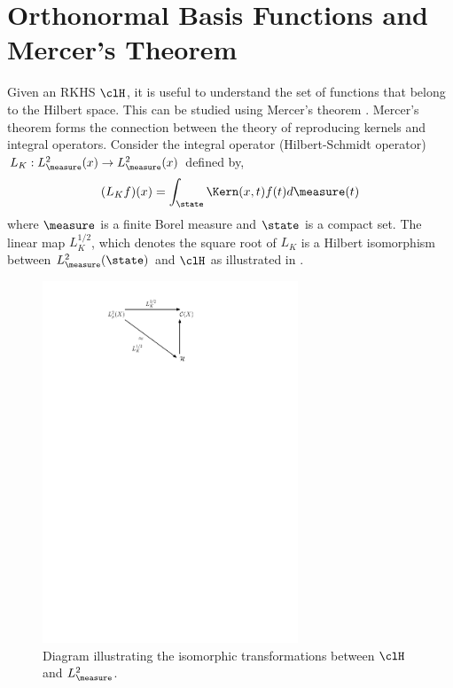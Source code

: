
\chapter{Orthonormal Basis Functions and Mercer's Theorem}
\label{a:mercers_theorem}

Given an RKHS $\clH$, it is useful to understand the set of functions that belong to the Hilbert space. This can be studied using Mercer's theorem \cite{merrus09}. Mercer's theorem forms the connection between the theory of reproducing kernels and integral operators. 
Consider the integral operator (Hilbert-Schmidt operator) $L_K:L^2_\measure(x) \to L^2_\measure(x)$ defined by,
\begin{equation}
(L_K f)(x) = \int_\state \Kern(x,t) f(t) d\measure(t)
\end{equation}
where $\measure$ is a finite Borel measure and $\state$ is a compact set.
The linear map $L_K^{1/2}$, which denotes the square root of $L_K$ is a Hilbert isomorphism between $L^2_{\measure}(\state)$ and $\clH$ as illustrated in . 

\begin{figure}[htbp]
	\centering
	\includegraphics[width=3in]{images/Chap3_RKHS_isomorphism}
	\caption{Diagram illustrating the isomorphic transformations between $\clH$ and $L^2_\measure$.}
	\label{fig:rkhs_isomorphism}
\end{figure}

